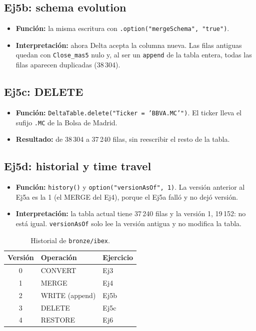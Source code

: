 \documentclass[11pt,a4paper]{article}
\newcommand{\code}[1]{\texttt{#1}}
\begin{document}
\subsection*{Ej5b: schema evolution}
\begin{itemize}
    \item \textbf{Función:} la misma escritura con \code{.option("mergeSchema", "true")}.
    \item \textbf{Interpretación:} ahora Delta acepta la columna nueva. Las filas antiguas quedan con \code{Close\_mas5} nulo y, al ser un \code{append} de la tabla entera, todas las filas aparecen duplicadas (38\,304).
\end{itemize}

\subsection*{Ej5c: DELETE}
\begin{itemize}
    \item \textbf{Función:} \code{DeltaTable.delete("Ticker = 'BBVA.MC'")}. El ticker lleva el sufijo \code{.MC} de la Bolsa de Madrid.
    \item \textbf{Resultado:} de 38\,304 a 37\,240 filas, sin reescribir el resto de la tabla.
\end{itemize}

\subsection*{Ej5d: historial y time travel}
\begin{itemize}
    \item \textbf{Función:} \code{history()} y \code{option("versionAsOf", 1)}. La versión anterior al Ej5a es la 1 (el MERGE del Ej4), porque el Ej5a falló y no dejó versión.
    \item \textbf{Interpretación:} la tabla actual tiene 37\,240 filas y la versión 1, 19\,152: no está igual. \code{versionAsOf} solo lee la versión antigua y no modifica la tabla.
\end{itemize}

\begin{table}[h]
\centering
\begin{tabular}{cll}
\toprule
Versión & Operación & Ejercicio \\
\midrule
0 & CONVERT & Ej3 \\
1 & MERGE & Ej4 \\
2 & WRITE (append) & Ej5b \\
3 & DELETE & Ej5c \\
4 & RESTORE & Ej6 \\
\bottomrule
\end{tabular}
\caption{Historial de \code{bronze/ibex}.}
\end{table}
\end{document}
